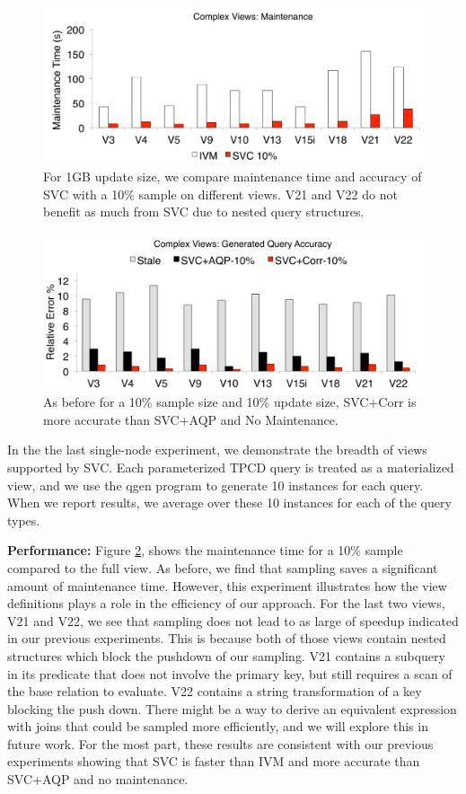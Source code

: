 \begin{figure}[t]
\centering
 \includegraphics[scale=0.19]{exp/msqv_1.pdf}
 \caption{For 1GB update size, we compare maintenance time and accuracy of SVC with a 10\% sample on different views. V21 and V22 do not benefit as much from SVC due to nested query structures. \label{exp3-acc}}
\end{figure}

\begin{figure}[t]
\centering
 \includegraphics[scale=0.19]{exp/msqv_2.pdf}
 \caption{As before for a 10\% sample size and 10\% update size, SVC+Corr is more accurate than SVC+AQP and No Maintenance. \label{exp3-acc}}
\end{figure}

In the the last single-node experiment, we demonstrate the breadth of views supported by SVC.
Each parameterized TPCD query is treated as a materialized view, and we use the \textsf{qgen} program 
to generate 10 instances for each query.
When we report results, we average over these 10 instances for each of the query types.

\textbf{Performance: }
Figure \ref{exp3-acc}, shows the maintenance time for a 10\% sample compared to the full view.
As before, we find that sampling saves a significant amount of maintenance time.
However, this experiment illustrates how the view definitions plays a role in the efficiency of our approach.
For the last two views, V21 and V22, we see that sampling does not lead to as large of speedup indicated in our previous experiments.  
This is because both of those views contain nested structures which block the pushdown of our sampling.
V21 contains a subquery in its predicate that does not involve the primary key, but still requires a scan of the base relation to evaluate.
V22 contains a string transformation of a key blocking the push down.
There might be a way to derive an equivalent expression with joins that could be sampled more efficiently, and we will explore this in future work.
For the most part, these results are consistent with our previous experiments showing that SVC is faster than IVM and more accurate than SVC+AQP and no maintenance.



